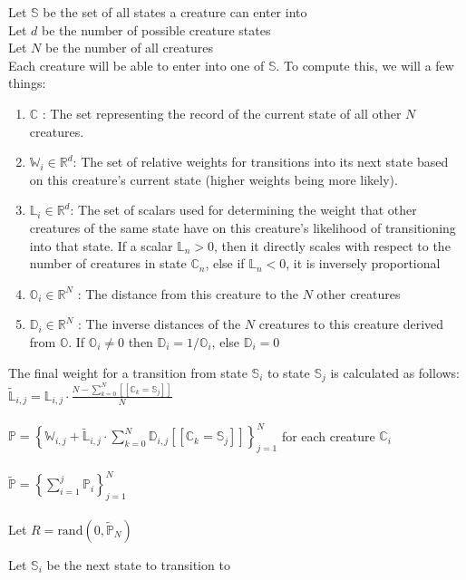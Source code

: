 \documentclass{article}
\newcommand\ind[1]{\ensuremath{[\![#1]\!]}}
\newcommand\rand{\text{rand}}
\begin{document}
Let $\mathbb{S}$ be the set of all states a creature can enter into\\
Let $d$ be the number of possible creature states\\
Let $N$ be the number of all creatures\\

Each creature will be able to enter into one of $\mathbb{S}$. To compute this, we will a few things:
\begin{enumerate}
    \item $\mathbb{C}$ : The set representing the record of the current state of all other $N$ creatures. 
    \item $\mathbb{W}_i \in \mathbb{R}^d$: The set of relative weights for transitions into its next state based on this creature's current state (higher weights being more likely). 
    \item $\mathbb{L}_i \in \mathbb{R}^d$: The set of scalars used for determining the weight that other creatures of the same state have on this creature's likelihood of transitioning into that state.  If a scalar $\mathbb{L}_n > 0$, then it directly scales with respect to the number of creatures in state $\mathbb{C}_n$, else if $\mathbb{L}_n < 0$, it is inversely proportional 
    \item $\mathbb{O}_i \in \mathbb{R}^N$ : The distance from this creature to the $N$ other creatures
    \item $\mathbb{D}_i \in \mathbb{R}^N$ : The inverse distances of the $N$ creatures to this creature derived from $\mathbb{O}$. If $\mathbb{O}_i \neq 0$ then $\mathbb{D}_i = 1 / \mathbb{O}_i$, else $\mathbb{D}_i = 0$
\end{enumerate}

The final weight for a transition from state $\mathbb{S}_i$ to state $\mathbb{S}_j$ is calculated as follows:\\

$\widetilde{\mathbb{L}}_{i,j} = \mathbb{L}_{i,j} \cdot \frac{N - \sum^{N}_{k = 0} \ind{\mathbb{C}_k = \mathbb{S}_j}}{N}$\\\\

$\mathbb{P} = {\left\{\mathbb{W}_{i,j} + \widetilde{\mathbb{L}}_{i,j} \cdot \sum^{N}_{k = 0} \mathbb{D}_{i,j} \ind{\mathbb{C}_k = \mathbb{S}_j}\right\}}_{j = 1}^N$ for each creature $\mathbb{C}_i$\\\\

$\widetilde{\mathbb{P}} = {\left\{ \sum_{i=1}^j \mathbb{P}_i \right\}}^N_{j=1}$\\\\

Let $R = \rand(0, \widetilde{\mathbb{P}}_N)$

\begin{algorithm}
    \begin{algorithmic}[1]
                \State Let $\mathbb{S}_i$ be the next state to transition to
            \EndIf
        \EndFor
    \end{algorithmic}
\end{algorithm}
\end{document}
